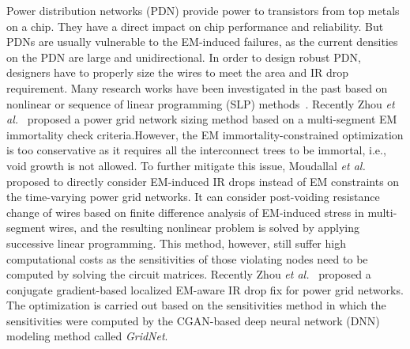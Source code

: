 Power distribution networks (PDN) provide power to transistors from top metals on a chip. They have a direct impact on chip performance and reliability. But PDNs are usually vulnerable to the EM-induced failures, as the current densities on the PDN are large and unidirectional. In order to design robust PDN, designers have to properly size the wires to meet the area and IR drop requirement. Many research works have been investigated in the past based on nonlinear or sequence of linear programming (SLP) methods~\cite{ChBr:TCAD'88,DuMa:DAC'89,Tan:DAC'99,Wang:TCAD'05,ZhouSun:TVLSI'19, Sukharev:2019pg,ZhouYu:ASPDAC'20,ZhouJin:ICCAD'20}.  Recently Zhou {\it et al.}~\cite{ZhouSun:TVLSI'19,ZhouChen:Integration'21} proposed a power grid network sizing method based on a multi-segment EM immortality check criteria.However, the EM immortality-constrained optimization is too conservative as it requires all the interconnect trees to be immortal, i.e., void growth is not allowed.  To further mitigate this issue, Moudallal {\it et al.}~\cite{Sukharev:2019pg} proposed to directly consider EM-induced IR drops instead of EM constraints on the time-varying power grid networks. It can consider post-voiding resistance change of wires based on finite difference analysis of EM-induced stress in multi-segment wires, and the resulting nonlinear problem is solved by applying successive linear programming. This method, however, still suffer high computational costs as the sensitivities of those violating nodes need to be computed by solving the circuit matrices. Recently Zhou {\it et al.}~\cite{ZhouJin:ICCAD'20, HanLiu:TCAD'22-23} proposed a conjugate gradient-based localized EM-aware IR drop fix for power grid networks. The optimization is carried out based on the sensitivities method in which the sensitivities were computed by the CGAN-based deep neural network (DNN) modeling method called {\it GridNet}.


   

